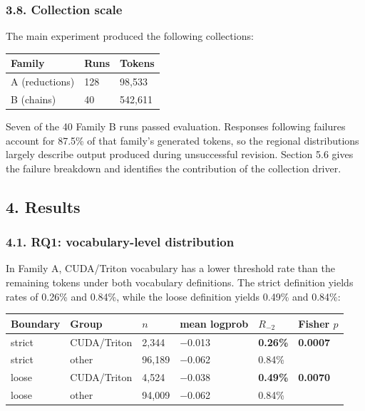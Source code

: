\documentclass[
  11pt,
]{article}
\begin{document}
\hypertarget{collection-scale}{%
\subsubsection{3.8. Collection scale}\label{collection-scale}}

The main experiment produced the following collections:

\begin{center}
\begin{minipage}{\linewidth}
\centering
\begin{tabular}{@{}lll@{}}
\toprule
Family & Runs & Tokens \\
\midrule

A (reductions) & 128 & 98,533 \\
B (chains) & 40 & 542,611 \\
\bottomrule
\end{tabular}
\end{minipage}
\end{center}

Seven of the 40 Family B runs passed evaluation. Responses following
failures account for 87.5\% of that family's generated tokens, so the
regional distributions largely describe output produced during
unsuccessful revision. Section 5.6 gives the failure breakdown and
identifies the contribution of the collection driver.

\hypertarget{results}{%
\subsection{4. Results}\label{results}}

\hypertarget{rq1-cuda-vocabulary-is-not-the-low-probability-tail}{%
\subsubsection{4.1. RQ1: vocabulary-level
distribution}\label{rq1-cuda-vocabulary-is-not-the-low-probability-tail}}

In Family A, CUDA/Triton vocabulary has a lower threshold rate than the
remaining tokens under both vocabulary definitions. The strict
definition yields rates of 0.26\% and 0.84\%, while the loose definition
yields 0.49\% and 0.84\%:

\begin{center}
\begin{minipage}{\linewidth}
\centering
\begin{tabular}{@{}llllll@{}}
\toprule
Boundary & Group & \(n\) & mean logprob & \(R_{-2}\) & Fisher \(p\) \\
\midrule

strict & CUDA/Triton & 2,344 & −0.013 & \textbf{0.26\%} &
\textbf{0.0007} \\
strict & other & 96,189 & −0.062 & 0.84\% & \\
loose & CUDA/Triton & 4,524 & −0.038 & \textbf{0.49\%} &
\textbf{0.0070} \\
loose & other & 94,009 & −0.062 & 0.84\% & \\
\bottomrule
\end{tabular}
\end{minipage}
\end{center}
\end{document}
